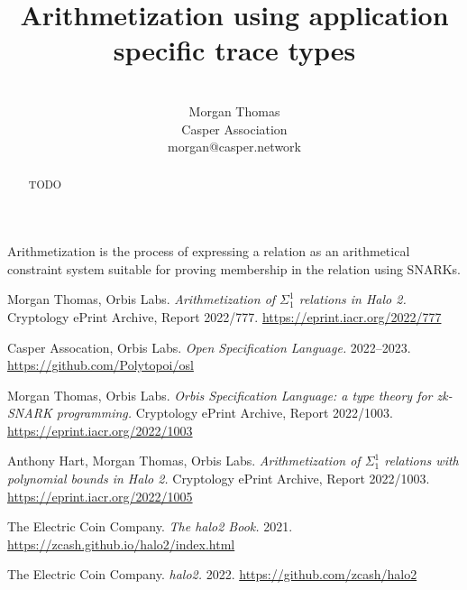 \documentclass[11pt]{article}
\title{Arithmetization using application specific trace types}
\author{ \\ Morgan Thomas \\ Casper Association \\ morgan@casper.network }
\begin{document}
\maketitle

\begin{abstract}
	TODO
\end{abstract}


Arithmetization is the process of expressing a relation as an arithmetical constraint system suitable for proving membership in the relation using SNARKs.


\clearpage

\begin{thebibliography}{6}
	
	 Morgan Thomas, Orbis Labs. \textit{Arithmetization of $\Sigma^1_1$ relations in Halo 2.} Cryptology ePrint Archive, Report 2022/777. \url{https://eprint.iacr.org/2022/777}

	 Casper Assocation, Orbis Labs. \textit{Open Specification Language.} 2022--2023. \url{https://github.com/Polytopoi/osl}

	 Morgan Thomas, Orbis Labs. \textit{Orbis Specification Language: a type theory for zk-SNARK programming.} Cryptology ePrint Archive, Report 2022/1003. \url{https://eprint.iacr.org/2022/1003}

	 Anthony Hart, Morgan Thomas, Orbis Labs. \textit{Arithmetization of $\Sigma^1_1$ relations with polynomial bounds in Halo 2.} Cryptology ePrint Archive, Report 2022/1003. \url{https://eprint.iacr.org/2022/1005}

	 The Electric Coin Company. \textit{The halo2 Book.} 2021. \url{https://zcash.github.io/halo2/index.html}

	 The Electric Coin Company. \textit{halo2.} 2022. \url{https://github.com/zcash/halo2}


\end{thebibliography}
\end{document}
